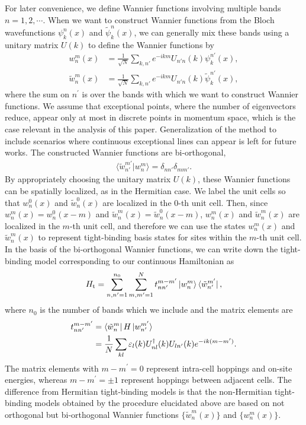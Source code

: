 \documentclass[prb,superscriptaddress,floatfix,twocolumn,showpacs]{revtex4-2}
\begin{document}
For later convenience, we define Wannier functions involving multiple bands $n = 1, 2, \cdots$. 
When we want to construct Wannier functions from the Bloch wavefunctions $\psi_k^{n}(x)$ and $\tilde{\psi}_k^{n}(x)$, we can generally mix these bands using a unitary matrix $U(k)$ to define the Wannier functions by
\begin{align}
    w_n^m(x)&=\frac{1}{\sqrt{N}}\sum_{k,n'}e^{-ikm}U_{n'n}(k)\psi_k^{n'}(x),
    \label{eq:wannier-function}\\
    \tilde{w}_n^m(x)&=\frac{1}{\sqrt{N}}\sum_{k,n'}e^{-ikm}U_{n'n}(k)\tilde{\psi}_k^{n'}(x),
    \label{eq:wannier-function_tilde}
\end{align}
where the sum on $n^\prime$ is over the bands with which we want to construct Wannier functions.
We assume that exceptional points, where the number of eigenvectors reduce, appear only at most in discrete points in momentum space, which is the case relevant in the analysis of this paper. Generalization of the method to include scenarios where continuous exceptional lines can appear is left for future works.
The constructed Wannier functions are bi-orthogonal, 
\begin{align}
    \langle\tilde{w}_{n'}^{m'}|w_n^m\rangle
    =\delta_{nn'}\delta_{mm'}.
    \label{eq:bi-orthogonal_wannier-function}
\end{align}
By appropriately choosing the unitary matrix $U(k)$,
these Wannier functions can be spatially localized, as in the Hermitian case. 
We label the unit cells so that $w_n^{0}(x)$ and $\tilde{w}_n^{0}(x)$ are localized in the $0$-th unit cell. 
Then, since $w_n^m(x) = w_n^0 (x - m)$ and $\tilde{w}_n^m(x) = \tilde{w}_n^0 (x - m)$, $w_n^{m}(x)$ and $\tilde{w}_n^{m}(x)$ are localized in the $m$-th unit cell, and therefore we can use the states $w_n^{m}(x)$ and $\tilde{w}_n^{m}(x)$ to represent tight-binding basis states for sites within the $m$-th unit cell.
In the basis of the bi-orthogonal Wannier functions, we can write down the tight-binding model corresponding to our continuous Hamiltonian as
\begin{align}
    H_\text{t}=\sum_{n,n'=1}^{n_0}\sum_{m,m'=1}^N
    t^{m-m'}_{nn'}\ket{w_n^m}\bra{\tilde{w}_{n'}^{m'}},
    \label{eq:lattice-hamiltonian}
\end{align}
where $n_0$ is the number of bands which we include and the matrix elements are
\begin{align}
    t^{m-m'}_{nn'}&=\bra{\tilde{w}_n^m}H\ket{w_{n'}^{m'}}
    \nonumber\\
    &=\frac{1}{N}\sum_{kl}\varepsilon_l(k)U^\dagger_{nl}(k)U_{ln'}(k)e^{-ik(m-m')}.
    \label{eq:hopping}
\end{align}
The matrix elements with $m-m^\prime = 0$ represent intra-cell hoppings and on-site energies, whereas $m-m^\prime = \pm 1$ represent hoppings between adjacent cells.
The difference from Hermitian tight-binding models is that the non-Hermitian tight-binding models obtained by the procedure elucidated above are based on not orthogonal but bi-orthogonal Wannier functions $\{\tilde{w}_n^m(x)\}$ and $\{w_n^m(x)\}$.
\end{document}
